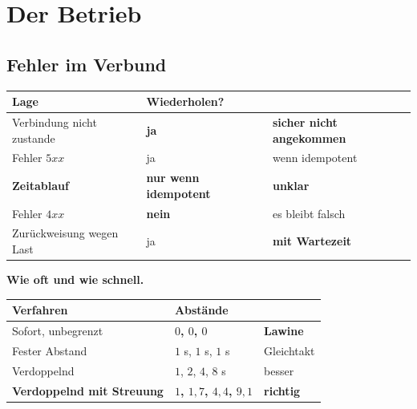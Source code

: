 \part{Der Betrieb}

\chapter{Fehler im Verbund}\label{kap:fehler}

\begin{merksatz}
\begin{center}
{\small
\renewcommand{\arraystretch}{1.5}
\begin{tabular}{@{}P{2.8cm}P{2.6cm}P{2.6cm}@{}}
\toprule
\textbf{Lage} & \textbf{Wiederholen?} & \\
\midrule
Verbindung nicht zustande & \textcolor{gruen}{\textbf{ja}} & \textbf{sicher nicht angekommen}\\
Fehler $5xx$ & \textcolor{gruen}{ja} & \textcolor{gruen}{wenn idempotent}\\
\textbf{Zeitablauf} & \textcolor{mittel}{\textbf{nur wenn idempotent}} & \textcolor{akzent}{\textbf{unklar}}\\
Fehler $4xx$ & \textcolor{akzent}{\textbf{nein}} & \textcolor{akzent}{es bleibt falsch}\\
Zurückweisung wegen Last & \textcolor{gruen}{ja} & \textbf{mit Wartezeit}\\
\bottomrule
\end{tabular}}
\end{center}

\begin{center}
\begin{minipage}{0.88\textwidth}
\end{minipage}
\end{center}

\textbf{Wie oft und wie schnell.}

\begin{center}
{\small
\renewcommand{\arraystretch}{1.45}
\begin{tabular}{@{}P{2.6cm}P{2.4cm}P{2.8cm}@{}}
\toprule
\textbf{Verfahren} & \textbf{Abstände} & \\
\midrule
Sofort, unbegrenzt & \textcolor{akzent}{\textbf{$0$, $0$, $0$}} & \textcolor{akzent}{\textbf{Lawine}}\\
Fester Abstand & $1$ s, $1$ s, $1$ s & \textcolor{akzent}{Gleichtakt}\\
Verdoppelnd & $1$, $2$, $4$, $8$ s & \textcolor{gruen}{besser}\\
\textbf{Verdoppelnd mit Streuung} & \textbf{$1$, $1{,}7$, $4{,}4$, $9{,}1$} & \textcolor{gruen}{\textbf{richtig}}\\
\bottomrule
\end{tabular}}
\end{center}


\end{merksatz}
